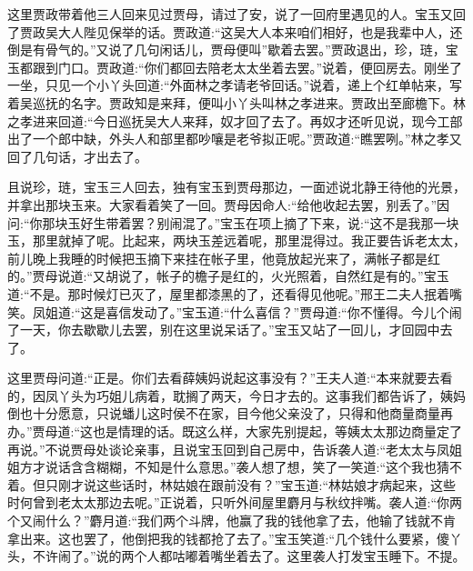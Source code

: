 \begin{parag}
    这里贾政带着他三人回来见过贾母，请过了安，说了一回府里遇见的人。宝玉又回了贾政吴大人陛见保举的话。贾政道:“这吴大人本来咱们相好，也是我辈中人，还倒是有骨气的。”又说了几句闲话儿，贾母便叫”歇着去罢。”贾政退出，珍，琏，宝玉都跟到门口。贾政道:“你们都回去陪老太太坐着去罢。”说着，便回房去。刚坐了一坐，只见一个小丫头回道:“外面林之孝请老爷回话。”说着，递上个红单帖来，写着吴巡抚的名字。贾政知是来拜，便叫小丫头叫林之孝进来。贾政出至廊檐下。林之孝进来回道:“今日巡抚吴大人来拜，奴才回了去了。再奴才还听见说，现今工部出了一个郎中缺，外头人和部里都吵嚷是老爷拟正呢。”贾政道:“瞧罢咧。”林之孝又回了几句话，才出去了。
\end{parag}


\begin{parag}
    且说珍，琏，宝玉三人回去，独有宝玉到贾母那边，一面述说北静王待他的光景，并拿出那块玉来。大家看着笑了一回。贾母因命人:“给他收起去罢，别丢了。”因问:“你那块玉好生带着罢？别闹混了。”宝玉在项上摘了下来，说:“这不是我那一块玉，那里就掉了呢。比起来，两块玉差远着呢，那里混得过。我正要告诉老太太，前儿晚上我睡的时候把玉摘下来挂在帐子里，他竟放起光来了，满帐子都是红的。”贾母说道:“又胡说了，帐子的檐子是红的，火光照着，自然红是有的。”宝玉道:“不是。那时候灯已灭了，屋里都漆黑的了，还看得见他呢。”邢王二夫人抿着嘴笑。凤姐道:“这是喜信发动了。”宝玉道:“什么喜信？”贾母道:“你不懂得。今儿个闹了一天，你去歇歇儿去罢，别在这里说呆话了。”宝玉又站了一回儿，才回园中去了。
\end{parag}


\begin{parag}
    这里贾母问道:“正是。你们去看薛姨妈说起这事没有？”王夫人道:“本来就要去看的，因凤丫头为巧姐儿病着，耽搁了两天，今日才去的。这事我们都告诉了，姨妈倒也十分愿意，只说蟠儿这时侯不在家，目今他父亲没了，只得和他商量商量再办。”贾母道:“这也是情理的话。既这么样，大家先别提起，等姨太太那边商量定了再说。”不说贾母处谈论亲事，且说宝玉回到自己房中，告诉袭人道:“老太太与凤姐姐方才说话含含糊糊，不知是什么意思。”袭人想了想，笑了一笑道:“这个我也猜不着。但只刚才说这些话时，林姑娘在跟前没有？”宝玉道:“林姑娘才病起来，这些时何曾到老太太那边去呢。”正说着，只听外间屋里麝月与秋纹拌嘴。袭人道:“你两个又闹什么？”麝月道:“我们两个斗牌，他赢了我的钱他拿了去，他输了钱就不肯拿出来。这也罢了，他倒把我的钱都抢了去了。”宝玉笑道:“几个钱什么要紧，傻丫头，不许闹了。”说的两个人都咕嘟着嘴坐着去了。这里袭人打发宝玉睡下。不提。
\end{parag}


